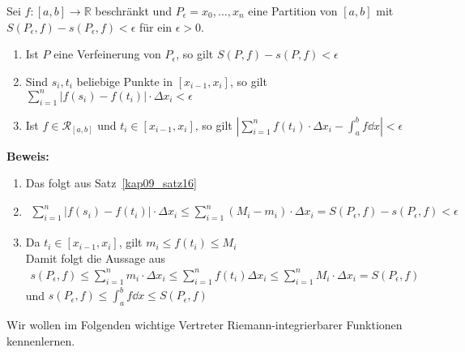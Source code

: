 \begin{Satz}{\label{kap10_satz19}
	Sei $f:[a,b] \rightarrow \mathbb{R}$ beschränkt und $P_{\epsilon} = 
	{x_0, \hdots, x_n}$ eine Partition von $[a,b]$ mit $S(P_{\epsilon},f) -
	s(P_{\epsilon},f) < \epsilon$ für ein $\epsilon > 0$.
	\begin{enumerate}
		\item Ist $P$ eine Verfeinerung von $P_{\epsilon}$, so gilt 
		$S(P,f) - s(P,f) < \epsilon$
		\item Sind $s_i, t_i$ beliebige Punkte in $[x_{i-1},x_i]$, so gilt 
		$\sum_{i=1}^n \left\vert f(s_i) - f(t_i) \right\vert \cdot \Delta x_i 
		< \epsilon$
		\item Ist $f \in \mathcal{R}_{[a,b]}$ und $t_i \in [x_{i-1},x_i]$, so 
		gilt 
		$\left\vert \sum_{i=1}^n f(t_i) \cdot \Delta x_i - \int_a^b f \dd{x} 
		\right\vert < \epsilon$ 
	\end{enumerate}	 
	\textbf{Beweis:}
	\begin{enumerate}
		\item Das folgt aus Satz~\ref{kap09_satz16}
		
		\item
		 \begin{align*}
			\sum_{i = 1}^n \left\vert f(s_i) - f(t_i) \right\vert	\cdot 
			\Delta x_i \leq \sum_{i=1}^n (M_i-m_i)\cdot \Delta x_i
			= S(P_{\epsilon},f) - s(P_{\epsilon},f) < \epsilon
		 \end{align*}
		 \item Da $t_i \in [x_{i-1},x_i]$, gilt $m_i \leq f(t_i) \leq M_i$ \\
		 	Damit folgt die Aussage aus
			 \begin{align*}
			 	s(P_{\epsilon},f ) \leq  
			 	\sum_{i = 1}^n m_i \cdot \Delta x_i \leq \sum_{i=1}^n f(t_i) \Delta 
			 	x_i \leq \sum_{i=1}^n M_i \cdot \Delta x_i = S(P_{\epsilon},f)
			 \end{align*}
			 und $s(P_{\epsilon},f) \leq \int_a^b f \dd{x} \leq S(P_{\epsilon},f)$
	\end{enumerate}
	Wir wollen im Folgenden wichtige Vertreter Riemann-integrierbarer 
	Funktionen kennenlernen.
}\end{Satz}

